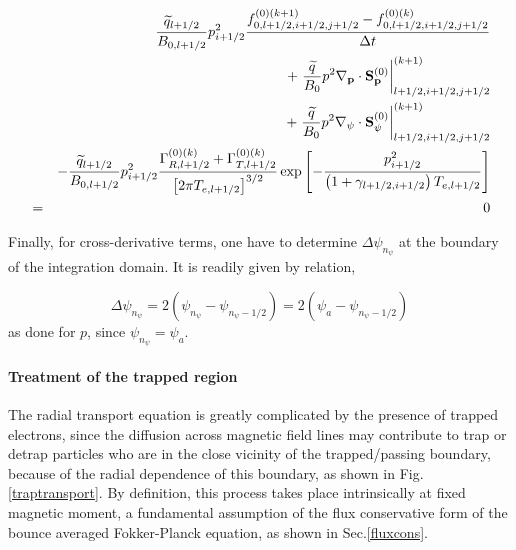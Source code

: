 \begin{eqnarray}
&&\frac{\widetilde{q}_{l+1/2}}{B_{0,l+1/2}}p_{i+1/2}^{2}\frac{%
f_{0,l+1/2,i+1/2,j+1/2}^{\left( 0\right)
(k+1)}-f_{0,l+1/2,i+1/2,j+1/2}^{\left( 0\right) (k)}}{\Delta t}  \nonumber \\
&&+\left. \frac{\widetilde{q}}{B_{0}}p^{2}\nabla _{\mathbf{p}}\cdot \mathbf{S%
}_{\mathbf{p}}^{\left( 0\right) }\right| _{l+1/2,i+1/2,j+1/2}^{(k+1)}
\nonumber \\
&&+\left. \frac{\widetilde{q}}{B_{0}}p^{2}\nabla _{\psi }\cdot \mathbf{S}%
_{\psi }^{\left( 0\right) }\right| _{l+1/2,i+1/2,j+1/2}^{(k+1)}  \nonumber \\
&&-\frac{\widetilde{q}_{l+1/2}}{B_{0,l+1/2}}p_{i+1/2}^{2}\frac{\Gamma
_{R,l+1/2}^{\left( 0\right) (k)}+\Gamma _{T,l+1/2}^{\left( 0\right) (k)}}{%
\left[ 2\pi T_{e,l+1/2}\right] ^{3/2}}\exp \left[ -\frac{p_{i+1/2}^{2}}{%
\left( 1+\gamma _{l+1/2,i+1/2}\right) T_{e,l+1/2}}\right]   \nonumber \\
&=&0
\end{eqnarray}

Finally, for cross-derivative terms, one have to determine $\Delta \psi
_{n_{\psi }}$ at the boundary of the integration domain. It is readily given
by relation,

\begin{equation}
\Delta \psi _{n_{\psi }}=2\left( \psi _{n_{\psi }}-\psi _{n_{\psi
}-1/2}\right) =2\left( \psi _{a}-\psi _{n_{\psi }-1/2}\right)
\end{equation}
as done for $p$, since $\psi _{n_{\psi }}=\psi _{a}$.

\paragraph{Treatment of the trapped region}

The radial transport equation is greatly complicated by the presence of
trapped electrons, since the diffusion across magnetic field lines may
contribute to trap or detrap particles who are in the close vicinity of the
trapped/passing boundary, because of the radial dependence of this boundary,
as shown in Fig. \ref{traptransport}. By definition, this process takes
place intrinsically at fixed magnetic moment, a fundamental assumption of
the flux conservative form of the bounce averaged Fokker-Planck equation, as
shown in Sec.\ref{fluxcons}.

%

